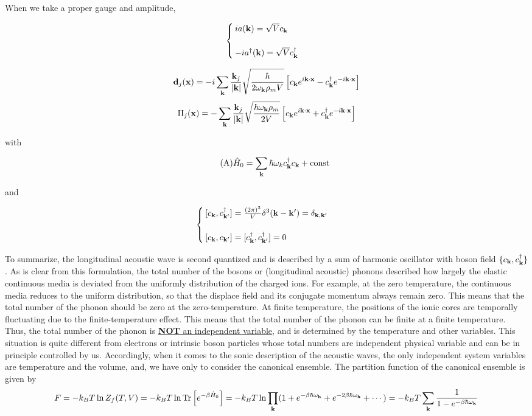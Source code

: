 When we take a proper gauge and amplitude, 

\[\begin{cases}
ia({\bf k}) = \sqrt{V}c_{\bf k}\\
\ \\
-ia^\dagger({\bf k}) = \sqrt{V}c^\dagger_{\bf k}
\end{cases}\]

\[{\bf d}_j({\bf x}) = -i\sum_{\bf k}\frac{{\bf k}_j}{|{\bf k}|}\sqrt{\frac{\hbar}{2\omega_{\bf k}\rho_mV}}\left[c_{\bf k}e^{i\bf k\cdot x}-c^\dagger_{\bf k}e^{-i\bf k\cdot x}\right]\]
\[\Pi_j({\bf x}) = -\sum_{\bf k}\frac{{\bf k}_j}{|{\bf k}|}\sqrt{\frac{\hbar\omega_{\bf k}\rho_m}{2V}}\left[c_{\bf k}e^{i\bf k\cdot x}+c^\dagger_{\bf k}e^{-i\bf k\cdot x}\right]\]

with

\begin{align}\tag{A}\label{5A}
\hat{H}_0 = \sum_{\bf k}\hbar\omega_k c_{\bf k}^\dagger c_{\bf k}+\text{const}
\end{align}

and

\[\begin{cases}
[c_{\bf k},c^\dagger_{\bf k'}] = \frac{(2\pi)^3}{V}\delta^3({\bf k-k'}) = \delta_{\bf k,k'}\\
\ \\
[c_{\bf k},c_{\bf k'}] = [c^\dagger_{\bf k},c^\dagger_{\bf k'}] = 0
\end{cases}\]

To summarize, the longitudinal acoustic wave is second quantized and is described by a sum of harmonic oscillator with boson field $\{c_{\bf k},c^\dagger_{\bf k}\}$. As is clear from this formulation, the total number of the bosons or (longitudinal acoustic) phonons described how largely the elastic continuous media is deviated from the uniformly distribution of the charged ions. For example, at the zero temperature, the continuous media reduces to the uniform distribution, so that the displace field and its conjugate momentum always remain zero. This means that the total number of the phonon should be zero at the zero-temperature. At finite temperature, the positions of the ionic cores are temporally fluctuating due to the finite-temperature effect. This means that the total number of the phonon can be finite at a finite temperature. Thus, the total number of the phonon is \uline{{\bf NOT} an independent variable}, and is determined by the temperature and other variables. This situation is quite different from electrons or intrinsic boson particles whose total numbers are independent physical variable and can be in principle controlled by us. Accordingly, when it comes to the sonic description of the acoustic waves, the only independent system variables are temperature and the volume, and, we have only to consider the canonical ensemble. The partition function of the canonical ensemble is given by
\[F = -k_BT\ln Z_f(T,V) = -k_BT\ln\text{Tr}\left[e^{-\beta\hat{H}_0}\right] = -k_BT\ln\prod_{\bf k}(1+e^{-\beta\hbar\omega_{\bf k}} + e^{-2\beta\hbar\omega_{\bf k}} + \cdots) = -k_BT\sum_{\bf k}\frac{1}{1-e^{-\beta\hbar\omega_{\bf k}}} \]

